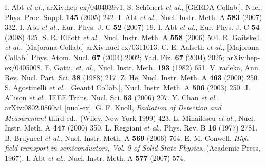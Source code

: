 \documentclass[epj]{svjour}
\begin{document}
\begin{thebibliography}{}
I. Abt \textit{et al.}, arXiv:hep-ex/0404039v1.
S. Sch\"onert \textit{et al.}, [GERDA Collab.],
Nucl. Phys. Proc. Suppl. \textbf{145} (2005) 242.
I. Abt \textit{et al.}, Nucl. Instr. Meth. A
\textbf{583} (2007) 332.
I. Abt \textit{et al.}, Eur. Phys. J. C \textbf{52}
(2007) 19.
I. Abt \textit{et al.}, Eur. Phys. J. C \textbf{54}
(2008) 425.
S. R. Elliott \textit{et al.}, Nucl. Instr. Meth. A
\textbf{558} (2006) 504.
R. Gaitskell \textit{et al.}, [Majorana Collab.]
arXiv:nucl-ex/0311013.
C. E. Aalseth \textit{et al.}, [Majorana Collab.]
Phys. Atom. Nucl. \textbf{67} (2004) 2002; Yad. Fiz. \textbf{67}
(2004) 2025; arXiv:hep-ex/0405008.
E. Gatti, \textit{et. al.},
Nucl. Instr. Meth. \textbf{193} (1982) 651.
V. radeka, Ann. Rev. Nucl. Part. Sci. \textbf{38}
(1988) 217.
Z. He, Nucl. Instr. Meth. A \textbf{463} (2000) 250.
S. Agostinelli \textit{et al.}, [Geant4 Collab.],
Nucl. Instr. Meth. A \textbf{506} (2003) 250.
J. Allison \textit{et al.}, IEEE
Trans. Nucl. Sci. \textbf{53} (2006) 207.
Y. Chan \textit{et al.}, arXiv:0802.0860v1 [nucl-ex].
G. F. Knoll, \textit{Radiation of Detection and
Measurement} third ed., (Wiley, New York 1999) 423.
L. Mihailescu \textit{et al.}, Nucl. Instr. Meth. A
\textbf{447} (2000) 350.
L. Reggiani \textit{et al.}, Phys. Rev. B \textbf{16}
(1977) 2781.
B. Bruyneel \textit{et al.}, Nucl. Instr. Meth. A
\textbf{569} (2006) 764.
E. M. Conwell, \textit{High field transport in
semiconductors, Vol. 9 of Solid State Physics}, (Academic Press,
1967).
I. Abt \textit{et al.}, Nucl. Instr. Meth. A \textbf{577}
(2007) 574.

\end{thebibliography}
%
\end{document}
